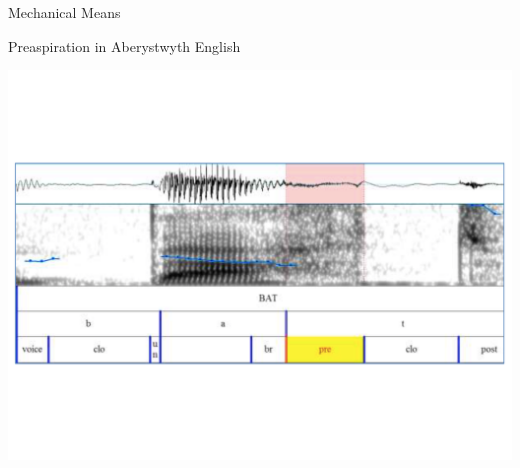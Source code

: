 \documentclass[hyperref={pdfpagelabels=false}]{beamer}
\begin{document}



\begin{frame}{Mechanical Means}
\begin{center}
\small{Preaspiration in Aberystwyth English \citep{Hejna2014}}

\includegraphics[trim=2cm 2cm 2cm 5cm, clip=true, width=.7\textwidth]{PreaspEx.pdf}
\end{center}
\end{frame}
\end{document}
